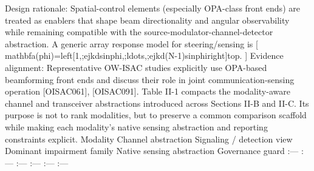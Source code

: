 {}
\markdownRendererSectionEnd \markdownRendererSectionBegin
{}\markdownRendererInterblockSeparator
{}Design rationale: Spatial-control elements (especially OPA-class front ends) are treated as enablers that shape beam directionality and angular observability while remaining compatible with the source-modulator-channel-detector abstraction.\markdownRendererParagraphSeparator
{}A generic array response model for steering/sensing is\markdownRendererSoftLineBreak
{}[\markdownRendererSoftLineBreak
{}\markdownRendererBackslash{}mathbf\markdownRendererLeftBrace{}a\markdownRendererRightBrace{}(\markdownRendererBackslash{}phi)=\markdownRendererBackslash{}left[1,;e\markdownRendererCircumflex{}\markdownRendererLeftBrace{}jkd\markdownRendererBackslash{}sin\markdownRendererBackslash{}phi\markdownRendererRightBrace{},;\markdownRendererBackslash{}ldots,;e\markdownRendererCircumflex{}\markdownRendererLeftBrace{}jkd(N-1)\markdownRendererBackslash{}sin\markdownRendererBackslash{}phi\markdownRendererRightBrace{}\markdownRendererBackslash{}right]\markdownRendererCircumflex{}\markdownRendererLeftBrace{}\markdownRendererBackslash{}top\markdownRendererRightBrace{}.\markdownRendererSoftLineBreak
{}]\markdownRendererParagraphSeparator
{}Evidence alignment: Representative OW-ISAC studies explicitly use OPA-based beamforming front ends and discuss their role in joint communication-sensing operation [O\markdownRendererUnderscore{}ISAC\markdownRendererUnderscore{}061], [O\markdownRendererUnderscore{}ISAC\markdownRendererUnderscore{}091].\markdownRendererParagraphSeparator
{}Table II-1 compacts the modality-aware channel and transceiver abstractions introduced across Sections II-B and II-C. Its purpose is not to rank modalities, but to preserve a common comparison scaffold while making each modality's native sensing abstraction and reporting constraints explicit.\markdownRendererInterblockSeparator
{}
\markdownRendererSectionEnd \markdownRendererSectionBegin
{}\markdownRendererInterblockSeparator
{}\markdownRendererPipe{} Modality \markdownRendererPipe{} Channel abstraction \markdownRendererPipe{} Signaling / detection view \markdownRendererPipe{} Dominant impairment family \markdownRendererPipe{} Native sensing abstraction \markdownRendererPipe{} Governance guard \markdownRendererPipe{}\markdownRendererSoftLineBreak
{}\markdownRendererPipe{} :--- \markdownRendererPipe{} :--- \markdownRendererPipe{} :--- \markdownRendererPipe{} :--- \markdownRendererPipe{} :--- \markdownRendererPipe{} :--- \markdownRendererPipe{}\markdownRendererSoftLineBreak
